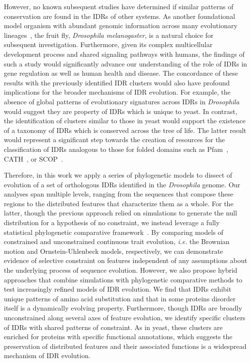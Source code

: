 However, no known subsequent studies have determined if similar patterns of conservation are found in the IDRs of other systems. As another foundational model organism with abundant genomic information across many evolutionary lineages~\cite{Yang2018, Miller2018, Kim2021, Gramates2022}, the fruit fly, \textit{Drosophila melanogaster}, is a natural choice for subsequent investigation. Furthermore, given its complex multicellular development process and shared signaling pathways with humans, the findings of such a study would significantly advance our understanding of the role of IDRs in gene regulation as well as human health and disease. The concordance of these results with the previously identified IDR clusters would also have profound implications for the broader mechanisms of IDR evolution. For example, the absence of global patterns of evolutionary signatures across IDRs in \textit{Drosophila} would suggest they are property of IDRs which is unique to yeast. In contrast, the identification of clusters similar to those in yeast would support the existence of a taxonomy of IDRs which is conserved across the tree of life. The latter result would represent a significant step towards the creation of resources for the classification of IDRs analogous to those for folded domains such as Pfam~\cite{Mistry2020}, CATH~\cite{Sillitoe2020}, or SCOP~\cite{Andreeva2013, Andreeva2019}.

Therefore, in this work we apply a series of phylogenetic models to dissect of evolution of a set of orthologous IDRs identified in the \textit{Drosophila} genome. Our analyses span multiple levels, ranging from the sequences that compose these regions to the distributed features that characterize them as a whole. For the latter, though the previous approach relied on simulations to generate the null distribution for a hypothesis of no constraint, we instead leverage a fully statistical phylogenetic comparative framework~\cite{Cornwell2017}. By comparing models of constrained and unconstrained continuous trait evolution, \textit{i.e.} the Brownian motion and Ornstein-Uhlenbeck models, respectively, we can demonstrate evidence of selective constraint on features independent of any assumptions about the underlying process of sequence evolution. However, we also propose hybrid approaches that combine simulations with phylogenetic comparative methods to test increasingly refined models of IDR evolution. We find that IDRs exhibit unique patterns of amino acid substitution and that in some proteins disorder itself is a dynamically evolving property. Furthermore, though IDRs are broadly unconstrained along several axes of feature evolution, we identify specific clusters of IDRs with shared patterns of constraint. As in yeast, these clusters are enriched for proteins with specific functional annotations, which suggests the preservation of distributed features and their associated functions is a widespread mechanism of IDR evolution.

